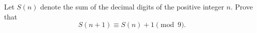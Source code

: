 Let $S(n)$ denote the sum of the decimal digits of the positive integer $n$. Prove that
\[
S(n+1)\equiv S(n)+1\pmod 9 .
\]
